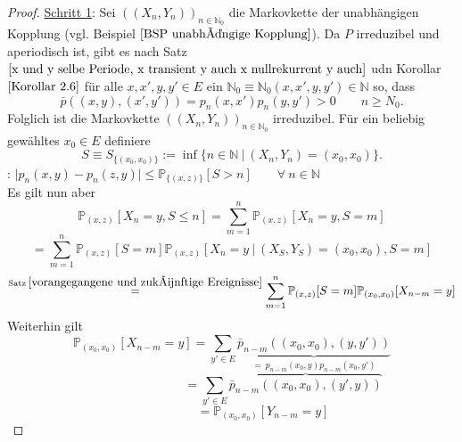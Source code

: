 \documentclass[a4paper,12pt]{scrartcl}
\theoremstyle{definition}
\begin{document}
\begin{proof}
\underline{Schritt 1}: Sei  $((X_{n},Y_{n}))_{n \in \mathbb{N}_{0}}$ die Markovkette der unabhängigen Kopplung (vgl. Beispiel $\ref{BSP unabhängige Kopplung}$). Da $P$ irreduzibel und aperiodisch ist, gibt es nach Satz $\ref{x und y selbe Periode, x transient y auch x nullrekurrent y auch}$ udn Korollar $\ref{Korollar 2.6}$ für alle $x,x',y,y' \in E$ ein $\mathbb{N}_{0} \equiv \mathbb{N}_{0}(x,x',y,y') \in \mathbb{N}$ so, dass
\begin{equation*}
\bar{p} \left( (x,y),(x',y') \right) = p_{n}(x,x')p_{n}(y,y') > 0 \qquad n \geq N_{0}.
\end{equation*}
Folglich ist die Markovkette  $((X_{n},Y_{n}))_{n \in \mathbb{N}_{0}}$ irreduzibel. Für ein beliebig gewähltes $x_{0} \in E$ definiere
\begin{equation*}
S \equiv S_{\lbrace (x_{0},x_{0}) \rbrace} := \inf \lbrace n \in \mathbb{N} \: | \:  \left( X_{n},Y_{n} \right)  =(x_{0},x_{0}) \rbrace.
\end{equation*}
: $\vert p_{n}(x,y) - p_{n}(z,y) \vert \leq \mathbb{P}_{\lbrace (x,z) \rbrace}[S>n] \qquad \forall \: n \in \mathbb{N}$
\\
Es gilt nun aber 
\begin{equation*}
\mathbb{P}_{(x,z)}[X_{n} = y, S \leq n] = \sum_{m=1}^{n} \mathbb{P}_{(x,z)}[X_{n}=y, S = m]
\end{equation*}
\begin{equation*}
= \sum_{m=1}^{n} \mathbb{P}_{(x,z)}[S = m]\mathbb{P}_{(x,z)}[X_{n}=y  \: | \: (X_{S},Y_{S})=(x_{0},x_{0}), S = m]
\end{equation*}
\begin{equation*}
\stackrel{\mathrm{Satz \:}\ref{vorangegangene und zukünftige Ereignisse}}{=}
\sum_{m=1}^{n} \mathbb{P}_{(x,z)}[S = m]\mathbb{P}_{(x_{0},x_{0})}[X_{n-m}=y]
\end{equation*}
Weiterhin gilt
\begin{equation*}
\mathbb{P}_{(x_{0},x_{0})}[X_{n-m}=y] = \sum_{y' \in E} \underbrace{\bar{p}_{n-m}\left( (x_{0},x_{0}),(y,y') \right)}_{= \: p_{n-m}(x_{0},y)p_{n-m}(x_{0},y')}
\end{equation*}
\begin{equation*}
\qquad \qquad  \qquad \qquad \:   = \sum_{y' \in E} \overbrace{\bar{p}_{n-m}\left( (x_{0},x_{0}),(y',y) \right)}
\end{equation*}
\begin{equation*}
\qquad \qquad  \quad = \mathbb{P}_{(x_{0},x_{0})}[Y_{n-m}=y]

\end{equation*}
\end{proof}
\end{document}
